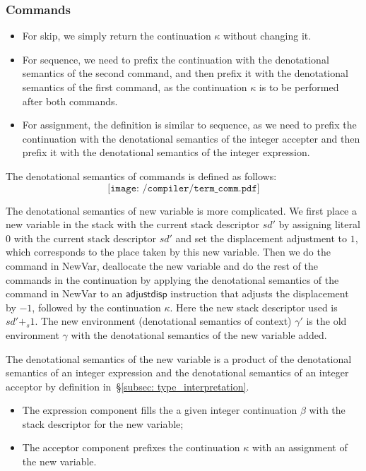 \documentclass[12pt,a4paper]{report}
\theoremstyle{definition}
\newcommand{\secref}[1]{\S\ref{#1}}
\begin{document}
        \subsubsection{Commands}
        \begin{itemize}
            \item For skip, we simply return the continuation $\kappa$ without changing it.
            \item For sequence, we need to prefix the continuation with the denotational semantics of the second command, and then prefix it with the denotational semantics of the first command, as the continuation $\kappa$ is to be performed after both commands.
            \item For assignment, the definition is similar to sequence, as we need to prefix the continuation with the denotational semantics of the integer accepter and then prefix it with the denotational semantics of the integer expression.
        \end{itemize}
        The denotational semantics of commands is defined as follows:
        \[\texttt{[image: /compiler/term\_comm.pdf]}\]

        The denotational semantics of new variable is more complicated. We first place a new variable in the stack with the current stack descriptor $sd'$ by assigning literal $0$ with the current stack descriptor $sd'$ and set the displacement adjustment to $1$, which corresponds to the place taken by this new variable. Then we do the command in \textsf{NewVar}, deallocate the new variable and do the rest of the commands in the continuation by applying the denotational semantics of the command in \textsf{NewVar} to an $\mathsf{adjustdisp}$ instruction that adjusts the displacement by $-1$, followed by the continuation $\kappa$. Here the new stack descriptor used is $sd' +_s 1$. The new environment (denotational semantics of context) $\gamma'$ is the old environment $\gamma$ with the denotational semantics of the new variable added.

        The denotational semantics of the new variable is a product of the denotational semantics of an integer expression and the denotational semantics of an integer acceptor by definition in~\secref{subsec: type_interpretation}.
        \begin{itemize}
            \item The expression component fills the a given integer continuation $\beta$ with the stack descriptor for the new variable;
            \item The acceptor component prefixes the continuation $\kappa$ with an assignment of the new variable.
        \end{itemize}
\end{document}
